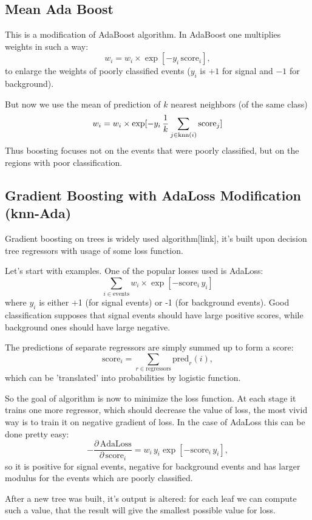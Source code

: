 \subsection{Mean Ada Boost}

This is a modification of AdaBoost algorithm. In AdaBoost one multiplies weights in such a way:
\[
	w_i = w_i \times \exp[-y_i \, \text{score}_i],
\]
to enlarge the weights of poorly classified events ($y_i$ is $+1$ for signal and $-1$ for background).

But now we use the mean of prediction of $k$ nearest neighbors (of the same class)
\[
	w_i = w_i \times \exp[-y_i \, \dfrac{1}{k} \sum_{j \in \text{knn}(i)} \text{score}_j]
\]
Thus boosting focuses not on the events that were poorly classified, but on the regions with poor classification.


\subsection{Gradient Boosting with AdaLoss Modification (knn-Ada)}

\def\score{\text{score}}
\def\knn{\text{knn}}
\def\FL{\text{FL}}

Gradient boosting on trees is widely used algorithm[link], it's built upon decision tree regressors with usage of some loss function. 

Let's start with examples. One of the popular losses used is AdaLoss:
\[
	\sum_{i \in \text{events}} w_i \times \exp [- \score_i \, y_i] 
\]
where $y_i$ is either +1 (for signal events) or -1 (for background events). Good classification supposes that signal events should have large positive scores, while background ones should have large negative.

The predictions of separate regressors are simply summed up to form a score:
\[
	\score_i = \sum_{r \in \text{regressors}} \text{pred}_r(i),
\]
which can be 'translated' into probabilities by logistic function.

So the goal of algorithm is now to minimize the loss function. At each stage it trains one more regressor, which should decrease the value of loss, the most vivid way is to train it on negative gradient of loss. In the case of AdaLoss this can be done pretty easy:
\[
	-\dfrac{\partial \, \text{AdaLoss}}{\partial \, \score_i} = w_i \, y_i \exp[- \score_i \, y_i],
\]
so it is positive for signal events, negative for background events and has larger modulus for the events which are poorly classified.

After a new tree was built, it's output is altered: for each leaf we can compute such a value, that the result will give the smallest possible value for loss.

